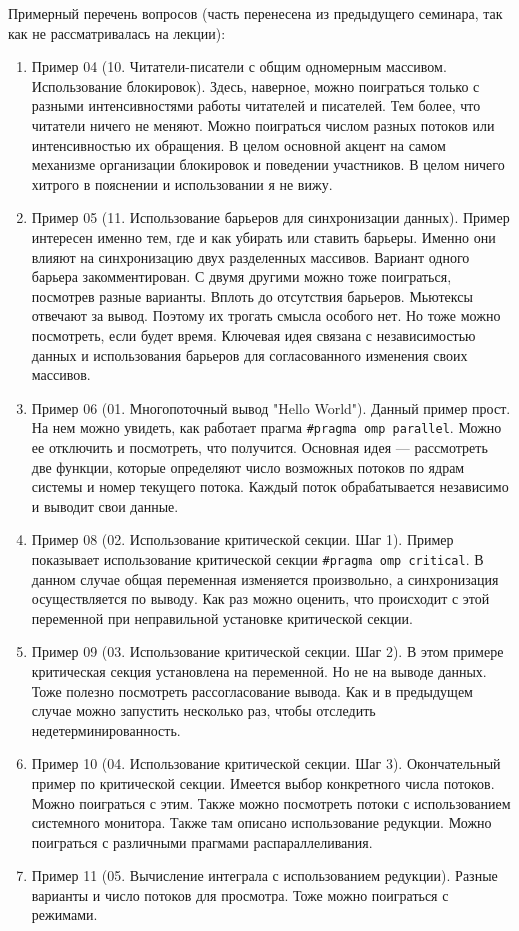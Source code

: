 Примерный перечень вопросов (часть перенесена из предыдущего семинара, так как не рассматривалась на лекции):
\begin{enumerate}
    \item Пример 04 (10. Читатели-писатели с общим одномерным массивом. Использование блокировок). Здесь, наверное, можно поиграться только с разными интенсивностями работы читателей и писателей. Тем более, что читатели ничего не меняют. Можно поиграться числом разных потоков или интенсивностью их обращения. В целом основной акцент на самом механизме организации блокировок и поведении участников. В целом ничего хитрого в пояснении и использовании я не вижу.
    \item Пример 05 (11. Использование барьеров для синхронизации данных). Пример интересен именно тем, где и как убирать или ставить барьеры. Именно они влияют на синхронизацию двух разделенных массивов. Вариант одного барьера закомментирован. С двумя другими можно тоже поиграться, посмотрев разные варианты. Вплоть до отсутствия барьеров. Мьютексы отвечают за вывод. Поэтому их трогать смысла особого нет. Но тоже можно посмотреть, если будет время. Ключевая идея связана с независимостью данных и использования барьеров для согласованного изменения своих массивов.
    \item Пример 06 (01. Многопоточный вывод "Hello World"). Данный пример прост. На нем можно увидеть, как работает прагма \verb|#pragma omp parallel|. Можно ее отключить и посмотреть, что получится. Основная идея --- рассмотреть две функции, которые определяют число возможных потоков по ядрам системы и номер текущего потока. Каждый поток обрабатывается независимо и выводит свои данные.
    \item Пример 08 (02. Использование критической секции. Шаг 1). Пример показывает использование критической секции \verb|#pragma omp critical|. В данном случае общая переменная изменяется произвольно, а синхронизация осуществляется по выводу. Как раз можно оценить, что происходит с этой переменной при неправильной установке критической секции.
    \item Пример 09 (03. Использование критической секции. Шаг 2). В этом примере критическая секция установлена на переменной. Но не на выводе данных. Тоже полезно посмотреть рассогласование вывода. Как и в предыдущем случае можно запустить несколько раз, чтобы отследить недетерминированность.
    \item Пример 10 (04. Использование критической секции. Шаг 3). Окончательный пример по критической секции. Имеется выбор конкретного числа потоков. Можно поиграться с этим. Также можно посмотреть потоки с использованием системного монитора. Также там описано использование редукции. Можно поиграться с различными прагмами распараллеливания.
    \item Пример 11 (05. Вычисление интеграла с использованием редукции). Разные варианты и число потоков для просмотра. Тоже можно поиграться с режимами.
\end{enumerate}

